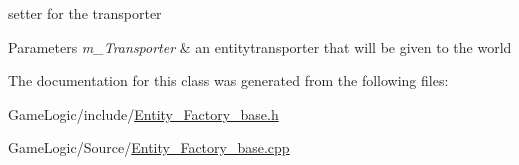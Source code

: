 setter for the transporter 
\begin{DoxyParams}{Parameters}
{\em m\+\_\+\+Transporter} & an entitytransporter that will be given to the world \\
\hline
\end{DoxyParams}


The documentation for this class was generated from the following files\+:\begin{DoxyCompactItemize}
\item 
Game\+Logic/include/\hyperlink{Entity__Factory__base_8h}{Entity\+\_\+\+Factory\+\_\+base.\+h}\item 
Game\+Logic/\+Source/\hyperlink{Entity__Factory__base_8cpp}{Entity\+\_\+\+Factory\+\_\+base.\+cpp}\end{DoxyCompactItemize}
